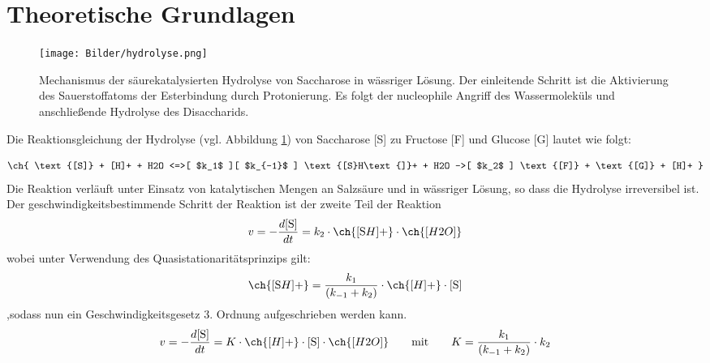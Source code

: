 \setlength\abovedisplayshortskip{15pt}
\setlength\belowdisplayshortskip{15pt}
\setlength\abovedisplayskip{15pt}
\setlength\belowdisplayskip{15pt}

\section{Theoretische Grundlagen \cite{Wedler}}




\begin{figure}[H]


     \texttt{[image: Bilder/hydrolyse.png]}
\caption{Mechanismus der säurekatalysierten Hydrolyse
von Saccharose in wässriger Lösung. Der einleitende Schritt ist
die Aktivierung des Sauerstoffatoms der Esterbindung durch Protonierung. Es folgt der nucleophile Angriff des Wassermoleküls und anschließende Hydrolyse des 
Disaccharids.}
\label{fig:hydrolyse}
\end{figure}

Die Reaktionsgleichung der Hydrolyse (vgl. Abbildung \ref{fig:hydrolyse}) von Saccharose [S] zu Fructose [F] und Glucose [G] lautet wie folgt: 

\begin{equation}
\ch{ \text{[S]} + [H]+ + H2O <=>[ $k_1$ ][ $k_{-1}$ ] \text{[S}H\text{]}+ + H2O ->[ $k_2$ ] \text{[F]} + \text{[G]} + [H]+  }
\label{Hydrolysegleichung}
\end{equation}
Die Reaktion verläuft unter Einsatz von katalytischen Mengen an Salzsäure und in wässriger Lösung, so dass die Hydrolyse irreversibel ist. Der geschwindigkeitsbestimmende Schritt der Reaktion ist der zweite Teil der Reaktion
\begin{align}
v = - \frac{d \text{[S]}}{dt}= k_2 \cdot \ch{\text{[S}H\text{]}+} \cdot \ch{[H2O]}
\label{eq:irreversibler2.Schritt}
\end{align}
wobei unter Verwendung des Quasistationaritätsprinzips gilt:
\begin{align}
\ch{\text{[S}H\text{]}+}=\frac{k_1}{\left(k_{-1} + k_2\right)}
 \cdot \ch{\text{[}H\text{]}+} \cdot \text{[S]}
 \label{eq:quasistationfürSH+}
\end{align}
,sodass nun ein Geschwindigkeitsgesetz 3. Ordnung aufgeschrieben werden kann.
\begin{align}
v = - \frac{d \text{[S]}}{dt}= K \cdot \ch{\text{[}H\text{]}+} \cdot \text{[S]} \cdot \ch{[H2O]}
\quad\quad \text{mit}\quad\quad  K=\frac{k_1}{\left(k_{-1} + k_2\right)}
 \cdot k_2
 \label{eq:Gesetz3.Ordnung}
\end{align}

